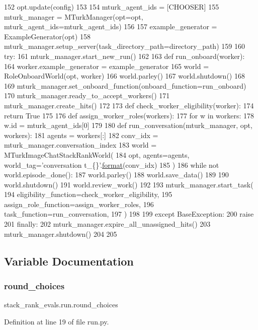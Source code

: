 \begin{DoxyCode}
152     opt.update(config)
153 
154     mturk\_agent\_ids = [CHOOSER]
155     mturk\_manager = MTurkManager(opt=opt, mturk\_agent\_ids=mturk\_agent\_ids)
156 
157     example\_generator = ExampleGenerator(opt)
158     mturk\_manager.setup\_server(task\_directory\_path=directory\_path)
159 
160     \textcolor{keywordflow}{try}:
161         mturk\_manager.start\_new\_run()
162 
163         \textcolor{keyword}{def }run\_onboard(worker):
164             worker.example\_generator = example\_generator
165             world = RoleOnboardWorld(opt, worker)
166             world.parley()
167             world.shutdown()
168 
169         mturk\_manager.set\_onboard\_function(onboard\_function=run\_onboard)
170         mturk\_manager.ready\_to\_accept\_workers()
171         mturk\_manager.create\_hits()
172 
173         \textcolor{keyword}{def }check\_worker\_eligibility(worker):
174             \textcolor{keywordflow}{return} \textcolor{keyword}{True}
175 
176         \textcolor{keyword}{def }assign\_worker\_roles(workers):
177             \textcolor{keywordflow}{for} w \textcolor{keywordflow}{in} workers:
178                 w.id = mturk\_agent\_ids[0]
179 
180         \textcolor{keyword}{def }run\_conversation(mturk\_manager, opt, workers):
181             agents = workers[:]
182             conv\_idx = mturk\_manager.conversation\_index
183             world = MTurkImageChatStackRankWorld(
184                 opt, agents=agents, world\_tag=\textcolor{stringliteral}{'conversation t\_\{\}'}.\hyperlink{namespaceparlai_1_1chat__service_1_1services_1_1messenger_1_1shared__utils_a32e2e2022b824fbaf80c747160b52a76}{format}(conv\_idx)
185             )
186             \textcolor{keywordflow}{while} \textcolor{keywordflow}{not} world.episode\_done():
187                 world.parley()
188             world.save\_data()
189 
190             world.shutdown()
191             world.review\_work()
192 
193         mturk\_manager.start\_task(
194             eligibility\_function=check\_worker\_eligibility,
195             assign\_role\_function=assign\_worker\_roles,
196             task\_function=run\_conversation,
197         )
198 
199     \textcolor{keywordflow}{except} BaseException:
200         \textcolor{keywordflow}{raise}
201     \textcolor{keywordflow}{finally}:
202         mturk\_manager.expire\_all\_unassigned\_hits()
203         mturk\_manager.shutdown()
204 
205 
\end{DoxyCode}


\subsection{Variable Documentation}
\mbox{\label{namespacestack__rank__evals_1_1run_a7da608ae54872ed1fb55c4c87600cf99}} 
\subsubsection{\texorpdfstring{round\+\_\+choices}{round\_choices}}
{\footnotesize\ttfamily stack\+\_\+rank\+\_\+evals.\+run.\+round\+\_\+choices}



Definition at line 19 of file run.\+py.

